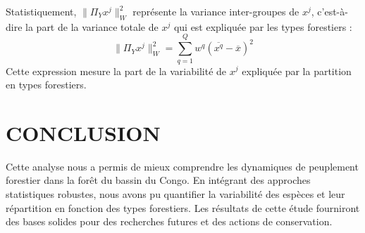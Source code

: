 \documentclass[a4paper,12pt]{article}
\begin{document}
Statistiquement, \( \| \Pi_Y x^j \|_W^2 \) représente la variance inter-groupes de \( x^j \), c'est-à-dire la part de la variance totale de \( x^j \) qui est expliquée par les types forestiers :
\[
\| \Pi_Y x^j \|_W^2 = \sum_{q=1}^{Q} w^q (\overline{x^q} - \overline{x})^2
\]
Cette expression mesure la part de la variabilité de \( x^j \) expliquée par la partition en types forestiers.

\section{CONCLUSION}
Cette analyse nous a permis de mieux comprendre les dynamiques de peuplement forestier dans la forêt du bassin du Congo. En intégrant des approches statistiques robustes, nous avons pu quantifier la variabilité des espèces et leur répartition en fonction des types forestiers. Les résultats de cette étude fourniront des bases solides pour des recherches futures et des actions de conservation.
\end{document}
